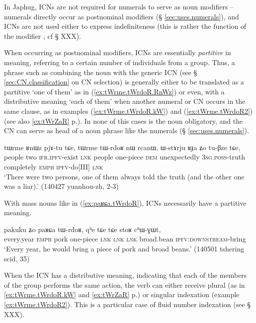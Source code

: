 In Japhug, ICNs are not required for numerals to serve as noun modifiers -- numerals  directly occur as postnominal modifiers (§ \ref{sec:uses.numerals}), and ICNs are not used either to express indefiniteness (this is rather the function of the modifier , cf  § XXX).

When occurring as postnominal modifiers, ICNs are essentially \textit{partitive} in meaning, referring to a certain number of individuals from a group. Thus, a phrase such as   combining the noun  with the generic ICN  (see §  \ref{sec:CN.classification} on CN selection) is generally either to be translated as a partitive `one of them'  as in (\ref{ex:tWrme.tWrdoR.RnWz}) or even, with a distributive meaning  `each of them' when another numeral or CN occurs in the same clause, as in examples (\ref{ex:tWrme.tWrdoR.kW}) and (\ref{ex:tWrme.tWrdoR2}) (see also \ref{ex:tWrZaR} p.\pageref{ex:tWrZaR}). In none of this cases is the noun   obligatory, and the CN can serve as head of a noun phrase like the numerals (§ \ref{sec:uses.numerals}).

\begin{exe}
\ex \label{ex:tWrme.tWrdoR.RnWz}
\gll tɯrme ʁnɯz pjɤ-tu tɕe, tɯrme tɯ-rdoʁ nɯ rcanɯ, ɯ-stɤrju ʁɟa ʑo tu-βze tɕe, \\
people two \textsc{ifr}.\textsc{ipfv}-exist \textsc{lnk} people one-piece \textsc{dem} unexpectedly \textsc{3sg}.\textsc{poss}-truth completely \textsc{emph} \textsc{ipfv}-do[III] \textsc{lnk} \\
\glt `There were two persons, one of them always told the truth (and the other one was a liar).' (140427 yuanhou-zh, 2-3)
\end{exe} 

With mass nouns like  in (\ref{ex:paʁɕa.tWrdoR}), ICNs necessarily have a partitive meaning.

\begin{exe}
\ex \label{ex:paʁɕa.tWrdoR}
\gll pakuku ʑo paʁɕa tɯ-rdoʁ, qʰe tɕe tɕe stoʁ cʰɯ-ɣɯt, \\
every.year \textsc{emph} pork one-piece \textsc{lnk} \textsc{lnk} \textsc{lnk} broad.bean \textsc{ipfv}:\textsc{downstream}-bring \\
\glt `Every year, he would bring a piece of pork and broad beans.' (140501 tshering scid, 35)
\end{exe} 

When the ICN has a distributive meaning, indicating that each of the members of the group performs the same action, the verb can either receive plural (as in \ref{ex:tWrme.tWrdoR.kW} and \ref{ex:tWrZaR} p.\pageref{ex:tWrZaR}) or singular indexation (example \ref{ex:tWrme.tWrdoR2}). This is a particular case of fluid number indexation (see § XXX).

